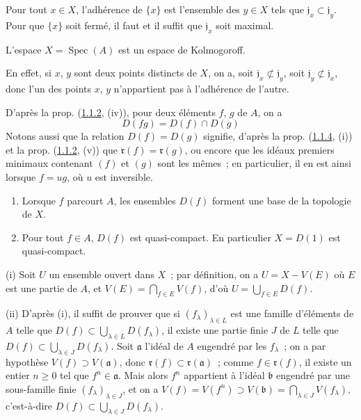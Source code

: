 \begin{corollary}[1.1.7]
\label{I.1.1.7-fr}
Pour tout $x\in X$, l'adhérence de $\{x\}$ est l'ensemble des $y\in X$ tels
que $\mathfrak{j}_x\subset\mathfrak{j}_y$. Pour que $\{x\}$ soit fermé, il
faut et il suffit que $\mathfrak{j}_x$ soit maximal.
\end{corollary}

\begin{corollary}[1.1.8]
\label{I.1.1.8-fr}
L'espace $X=\operatorname{Spec}(A)$ est un espace de Kolmogoroff.
\end{corollary}

En effet, si $x$, $y$ sont deux points distincts de $X$, on a, soit
$\mathfrak{j}_x\not\subset\mathfrak{j}_y$, soit
$\mathfrak{j}_y\not\subset\mathfrak{j}_x$, donc l'un des points $x$, $y$
n'appartient pas à l'adhérence de l'autre.

\begin{env}[1.1.9]
\label{I.1.1.9-fr}
D'après la prop. (\hyperref[I.1.1.2-fr]{1.1.2}, (iv)), pour deux éléments
$f$, $g$ de $A$, on a
\begin{equation}
  D(fg)=D(f)\cap D(g)
  \tag{1.1.9.1}\label{I.1.1.9.1-fr}
\end{equation}
Notons aussi que la relation $D(f)=D(g)$ signifie, d'après la prop.
(\hyperref[I.1.1.4-fr]{1.1.4}, (i)) et la prop.
(\hyperref[I.1.1.2-fr]{1.1.2}, (v)) que
$\mathfrak{r}(f)=\mathfrak{r}(g)$, ou encore que les idéaux premiers minimaux
contenant $(f)$ et $(g)$ sont les mêmes~; en particulier, il en est ainsi
lorsque $f=ug$, où $u$ est inversible.
\end{env}

\begin{proposition}[1.1.10]
\label{I.1.1.10-fr}
\begin{enumerate}
  \item[\rm(i)] Lorsque $f$ parcourt $A$, les ensembles $D(f)$ forment une
  base de la topologie de $X$.
  \item[\rm(ii)] Pour tout $f\in A$, $D(f)$ est quasi-compact. En particulier
  $X=D(1)$ est quasi-compact.
\end{enumerate}
\end{proposition}

(i) Soit $U$ un ensemble ouvert dans $X$~; par définition, on a
$U=X-V(E)$ où $E$ est une partie de $A$, et
$V(E)=\bigcap_{f\in E}V(f)$, d'où $U=\bigcup_{f\in E}D(f)$.

(ii) D'après (i), il suffit de prouver que si $(f_\lambda)_{\lambda\in L}$
est une famille d'éléments de $A$ telle que
$D(f)\subset\bigcup_{\lambda\in L}D(f_\lambda)$, il existe une partie finie
$J$ de $L$ telle que $D(f)\subset\bigcup_{\lambda\in J}D(f_\lambda)$. Soit
$\mathfrak{a}$ l'idéal de $A$ engendré par les $f_\lambda$~; on a par
hypothèse $V(f)\supset V(\mathfrak{a})$, donc
$\mathfrak{r}(f)\subset\mathfrak{r}(\mathfrak{a})$~; comme
$f\in\mathfrak{r}(f)$, il existe un entier $n\geq0$ tel que
$f^n\in\mathfrak{a}$. Mais alors $f^n$ appartient à l'idéal $\mathfrak{b}$
engendré par une sous-famille finie $(f_\lambda)_{\lambda\in J}$, et on a
$V(f)=V(f^n)\supset V(\mathfrak{b})=\bigcap_{\lambda\in J}V(f_\lambda)$,
c'est-à-dire $D(f)\subset\bigcup_{\lambda\in J}D(f_\lambda)$.

